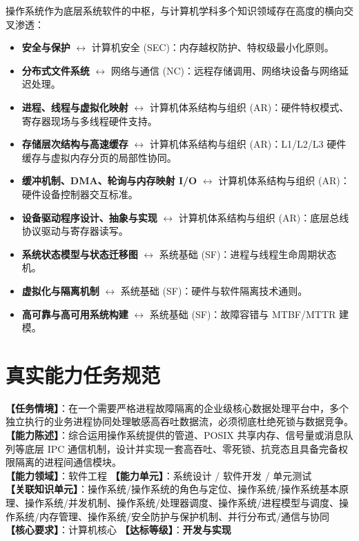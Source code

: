操作系统作为底层系统软件的中枢，与计算机学科多个知识领域存在高度的横向交叉渗透：
\begin{itemize}\setlength{\itemsep}{0pt}\setlength{\parskip}{0pt}
    \item \textbf{安全与保护} $\longleftrightarrow$ 计算机安全 (SEC)：内存越权防护、特权级最小化原则。
    \item \textbf{分布式文件系统} $\longleftrightarrow$ 网络与通信 (NC)：远程存储调用、网络块设备与网络延迟处理。
    \item \textbf{进程、线程与虚拟化映射} $\longleftrightarrow$ 计算机体系结构与组织 (AR)：硬件特权模式、寄存器现场与多线程硬件支持。
    \item \textbf{存储层次结构与高速缓存} $\longleftrightarrow$ 计算机体系结构与组织 (AR)：L1/L2/L3 硬件缓存与虚拟内存分页的局部性协同。
    \item \textbf{缓冲机制、DMA、轮询与内存映射 I/O} $\longleftrightarrow$ 计算机体系结构与组织 (AR)：硬件设备控制器交互标准。
    \item \textbf{设备驱动程序设计、抽象与实现} $\longleftrightarrow$ 计算机体系结构与组织 (AR)：底层总线协议驱动与寄存器读写。
    \item \textbf{系统状态模型与状态迁移图} $\longleftrightarrow$ 系统基础 (SF)：进程与线程生命周期状态机。
    \item \textbf{虚拟化与隔离机制} $\longleftrightarrow$ 系统基础 (SF)：硬件与软件隔离技术通则。
    \item \textbf{高可靠与高可用系统构建} $\longleftrightarrow$ 系统基础 (SF)：故障容错与 MTBF/MTTR 建模。
\end{itemize}

\section{真实能力任务规范}

\begin{taskbox}[任务 1：设计并开发多进程安全通信软件组件]
\textbf{【任务情境】}：在一个需要严格进程故障隔离的企业级核心数据处理平台中，多个独立执行的业务进程协同处理敏感高吞吐数据流，必须彻底杜绝死锁与数据竞争。\\
\textbf{【能力陈述】}：综合运用操作系统提供的管道、POSIX 共享内存、信号量或消息队列等底层 IPC 通信机制，设计并实现一套高吞吐、零死锁、抗竞态且具备完备权限隔离的进程间通信模块。\\
\textbf{【能力领域】}：软件工程 \quad \textbf{【能力单元】}：系统设计 / 软件开发 / 单元测试\\
\textbf{【关联知识单元】}：操作系统/操作系统的角色与定位、操作系统/操作系统基本原理、操作系统/并发机制、操作系统/处理器调度、操作系统/进程模型与调度、操作系统/内存管理、操作系统/安全防护与保护机制、并行分布式/通信与协同\\
\textbf{【核心要求】}：计算机核心 \quad \textbf{【达标等级】}：\textbf{开发与实现}
\end{taskbox}

